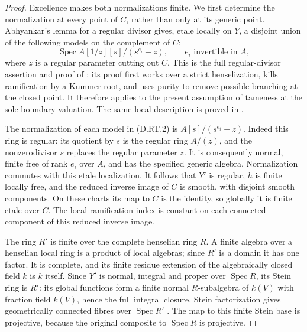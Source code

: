 \begin{proof}
Excellence makes both normalizations finite. We first determine
the normalization at every point of $C$, rather than only at its
generic point. Abhyankar's lemma for a regular divisor gives,
etale locally on $Y$, a disjoint union of the following models
on the complement of $C$:
\[
 \operatorname{Spec}A[1/z][s]/(s^{e_i}-z),\qquad
        e_i\text{ invertible in }A,
                                                        \tag{D.RT.2}
\]
where $z$ is a regular parameter cutting out $C$.
This is the full regular-divisor assertion and proof of
\citep[Lemma 58.31.5, Tag 0EYG]{StacksRadialTameGeometryB};
its proof first works over a strict henselization, kills
ramification by a Kummer root, and uses purity to remove
possible branching at the closed point. It therefore applies
to the present assumption of tameness at the sole boundary
valuation. The same local description is proved in
\citet[Expose XIII, Propositions 5.1--5.2 and
Corollary 5.3, original pp.~428--430]{SGA1}.

The normalization of each model in (D.RT.2) is
$A[s]/(s^{e_i}-z)$. Indeed this ring is regular: its quotient
by $s$ is the regular ring $A/(z)$, and the nonzerodivisor
$s$ replaces the regular parameter $z$. It is consequently
normal, finite free of rank $e_i$ over $A$, and has the
specified generic algebra. Normalization commutes with this
etale localization. It follows that $Y'$ is regular, $h$ is
finite locally free, and the reduced inverse image of $C$
is smooth, with disjoint smooth components. On these charts
its map to $C$ is the identity, so globally it is finite etale
over $C$. The local ramification index is constant on each
connected component of this reduced inverse image.

The ring $R'$ is finite over the complete henselian ring $R$.
A finite algebra over a henselian local ring is a product
of local algebras; since $R'$ is a domain it has one factor.
It is complete, and its finite residue extension of the
algebraically closed field $k$ is $k$ itself. Since $Y'$ is
normal, integral and proper over $\operatorname{Spec}R$, its
Stein ring is $R'$: its global functions form a finite normal
$R$-subalgebra of $k(V)$ with fraction field $k(V)$, hence
the full integral closure. Stein factorization gives
geometrically connected fibres over $\operatorname{Spec}R'$
\citep[Theorem 37.53.4, Tag 03H0, complete proof]
{StacksRadialTameGeometryB}. The map to this finite Stein
base is projective, because the original composite to
$\operatorname{Spec}R$ is projective.


\end{proof}
